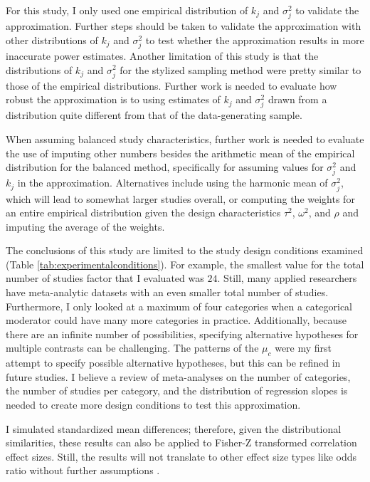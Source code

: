 For this study, I only used one empirical distribution of $k_j$ and $\sigma_j^2$ to validate the approximation. Further steps should be taken to validate the approximation with other distributions of $k_j$ and $\sigma_j^2$ to test whether the approximation results in more inaccurate power estimates. Another limitation of this study is that the distributions of $k_j$ and $\sigma_j^2$ for the stylized sampling method were pretty similar to those of the empirical distributions. Further work is needed to evaluate how robust the approximation is to using estimates of $k_j$ and $\sigma_j^2$ drawn from a distribution quite different from that of the data-generating sample. 

When assuming balanced study characteristics, further work is needed to evaluate the use of imputing other numbers besides the arithmetic mean of the empirical distribution for the balanced method, specifically for assuming values for $\sigma_j^2$ and $k_j$ in the approximation. Alternatives include using the harmonic mean of $\sigma_j^2$, which will lead to somewhat larger studies overall, or computing the weights for an entire empirical distribution given the design characteristics $\tau^2$, $\omega^2$, and $\rho$ and imputing the average of the weights. 

The conclusions of this study are limited to the study design conditions examined (Table \ref{tab:experimentalconditions}). For example, the smallest value for the total number of studies factor that I evaluated was $24$. Still, many applied researchers have meta-analytic datasets with an even smaller total number of studies. Furthermore, I only looked at a maximum of four categories when a categorical moderator could have many more categories in practice. Additionally, because there are an infinite number of possibilities, specifying alternative hypotheses for multiple contrasts can be challenging. The patterns of the $\mu_c$ were my first attempt to specify possible alternative hypotheses, but this can be refined in future studies. I believe a review of meta-analyses on the number of categories, the number of studies per category, and the distribution of regression slopes is needed to create more design conditions to test this approximation. 

I simulated standardized mean differences; therefore, given the distributional similarities, these results can also be applied to Fisher-Z transformed correlation effect sizes. Still, the results will not translate to other effect size types like odds ratio without further assumptions \autocite{vembye2023}.

